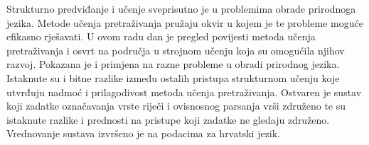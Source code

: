 \begin{sazetak}
Strukturno predviđanje i učenje sveprisutno je u problemima obrade prirodnoga
jezika. Metode učenja pretraživanja pružaju okvir u kojem je te probleme moguće
efikasno rješavati. U ovom radu dan je pregled povijesti metoda učenja
pretraživanja i osvrt na područja u strojnom učenju koja su omogućila njihov
razvoj. Pokazana je i primjena na razne probleme u obradi prirodnog jezika.
Istaknute su i bitne razlike između ostalih pristupa strukturnom učenju koje
utvrđuju nadmoć i prilagodivost metoda učenja pretraživanja. Ostvaren je
sustav koji zadatke označavanja vrste riječi i ovisnosnog parsanja vrši
združeno te su istaknute razlike i prednosti na pristupe koji zadatke ne gledaju
združeno. Vrednovanje sustava izvršeno je na podacima za hrvatski jezik.

\end{sazetak}

